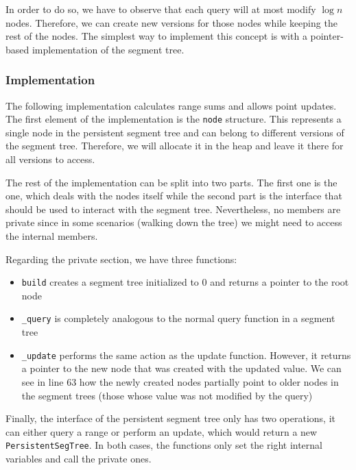 In order to do so, we have to observe that each query will at most modify 
$\log n$ nodes. Therefore, we can create new versions for those nodes
while keeping the rest of the nodes. The simplest way to implement this concept
is with a pointer-based implementation of the segment tree.

\subsubsection{Implementation}
The following implementation calculates range sums and allows point updates.
The first element of the implementation is the \texttt{node} structure.
This represents a single node in the persistent segment tree and can belong
to different versions of the segment tree. Therefore, we will allocate it
in the heap and leave it there for all versions to access.

The rest of the implementation can be split into two parts. The first one is
the  one, which deals with the nodes itself while the second
part is the interface that should be used to interact with the segment
tree. Nevertheless, no members are private since in some scenarios 
(walking down the tree) we might need to access the internal members.

Regarding the private section, we have three functions:
\begin{itemize}
		\item \texttt{build} creates a segment tree initialized to 0
				and returns a pointer to the root node
		\item \texttt{\_query} is completely analogous to the normal query
				function in a segment tree
		\item \texttt{\_update} performs the same action as the 
				 update function. However, it returns 
				a pointer to the new node that was created with the updated
				value. We can  see in line 63 how the newly created nodes
				partially point to older nodes in the segment trees (those
				whose value was not modified by the query) 
\end{itemize}

\newpage
Finally, the interface of the persistent segment tree only has two operations,
it can either query a range or perform an update, which would return a
new \texttt{PersistentSegTree}.
In both cases, the functions only set the right internal variables and call the
private ones. 

